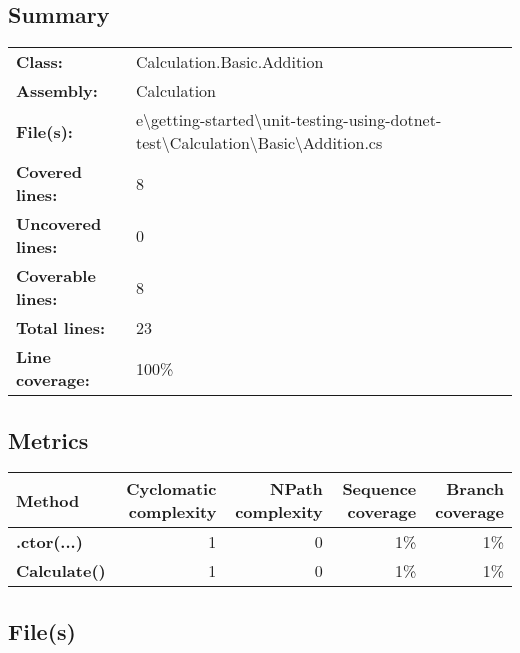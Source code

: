 \documentclass[a4paper,landscape,10pt]{article}
\begin{document}
\subsection{Summary}
\begin{longtable}[l]{ll}
\textbf{Class:} & Calculation.Basic.Addition\\
\textbf{Assembly:} & Calculation\\
\textbf{File(s):} & \begin{minipage}[t]{12cm}{e\textbackslash getting-started\textbackslash unit-testing-using-dotnet-test\textbackslash Calculation\textbackslash Basic\textbackslash Addition.cs}\end{minipage} \\
\textbf{Covered lines:} & 8\\
\textbf{Uncovered lines:} & 0\\
\textbf{Coverable lines:} & 8\\
\textbf{Total lines:} & 23\\
\textbf{Line coverage:} & 100\%\\
\end{longtable}
\subsection{Metrics}
\begin{longtable}[l]{|l|r|r|r|r|}
\hline
\textbf{Method} & \textbf{Cyclomatic complexity} & \textbf{NPath complexity} & \textbf{Sequence coverage} & \textbf{Branch coverage}\\
\hline
\textbf{.ctor(...)} & 1 & 0 & 1\% & 1\%\\
\hline
\textbf{Calculate()} & 1 & 0 & 1\% & 1\%\\
\hline
\end{longtable}
\subsection{File(s)}
\end{document}
